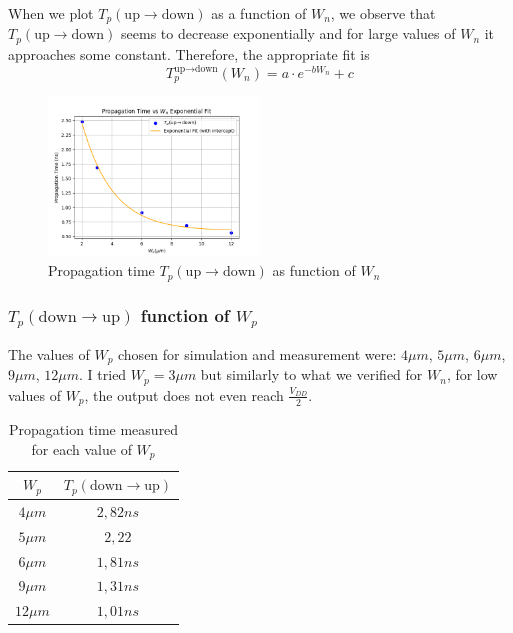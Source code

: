 \documentclass[../main.tex]{subfiles}
\begin{document}
{{			When we plot $T_p(\text{up} \to \text{down})$ as a function of $W_n$, we observe that $T_p(\text{up} \to \text{down})$ seems to decrease exponentially and for large values of $W_n$ it approaches some constant. Therefore, the appropriate fit is
			$$T_p^{\text{up} \to \text{down}}(W_n) = a\cdot e^{-bW_n} + c$$
			
			\begin{figure}[H]
				\centering
				\includegraphics[width=0.5\textwidth]{plots/Q7_Wn_plot.png}
				\caption{Propagation time $T_p(\text{up} \to \text{down})$ as function of $W_n$}
			\end{figure}
			
			
		}
		
		\subsubsection{$T_p(\text{down} \to \text{up})$ function of $W_p$}
		{
			The values of $W_p$ chosen for simulation and measurement were: $4\mu m$, $5\mu m$, $6\mu m$, $9\mu m$, $12\mu m$. I tried $W_p = 3\mu m$ but similarly to what we verified for $W_n$, for low values of $W_p$, the output does not even reach $\frac{V_{DD}}{2}$.
			
			\begin{table}[htbp]
				\centering
				\renewcommand{\arraystretch}{1.5} %
				\begin{tabular}{|c|c|}
					\hline
					$W_p$ & $T_p(\text{down} \to \text{up})$ \\ \hline
					$4\mu m$ & $2,82ns$  \\ \hline
					$5\mu m$ & $2,22$ \\ \hline
					$6\mu m$ & $1,81ns$ \\ \hline
					$9\mu m$ & $1,31ns$ \\ \hline
					$12\mu m$& $1,01ns$ \\ \hline
				\end{tabular}
				\caption{Propagation time measured for each value of $W_p$}
				\label{tab:wpdep}
			\end{table}
			
}}
\end{document}
